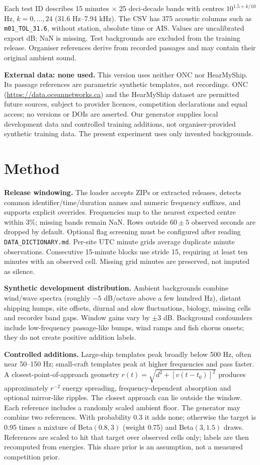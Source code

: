 \documentclass[a4paper,11pt]{article}
\begin{document}
Each test ID describes 15 minutes $\times$ 25 deci-decade bands with centres
$10^{1.5+k/10}$ Hz, $k=0,\ldots,24$ (31.6 Hz--7.94 kHz). The CSV has 375
acoustic columns such as \texttt{m01\_TOL\_31.6}, without station, absolute time
or AIS. Values are uncalibrated export dB; NaN is missing. Test backgrounds
are excluded from the training release. Organiser references derive from
recorded passages and may contain their original ambient sound.

\textbf{External data: none used.} This version uses neither ONC nor HearMyShip.
Its passage references are parametric synthetic templates, not recordings.
ONC (\url{https://data.oceannetworks.ca}) and the HearMyShip dataset are permitted
future sources, subject to provider licences, competition declarations and
equal access; no versions or DOIs are asserted. Our generator supplies local
development data and controlled training additions, not organiser-provided
synthetic training data. The present experiment uses only invented backgrounds.

\newpage
\section{Method}
\textbf{Release windowing.} The loader accepts ZIPs or extracted releases,
detects common identifier/time/duration names and numeric frequency suffixes,
and supports explicit overrides. Frequencies map to the nearest expected
centre within 3\%; missing bands remain NaN. Rows outside $60\pm5$ observed
seconds are dropped by default. Optional flag screening must be configured
after reading \texttt{DATA\_DICTIONARY.md}. Per-site UTC minute grids average
duplicate minute observations. Consecutive 15-minute blocks use stride 15,
requiring at least ten minutes with an observed cell. Missing grid minutes
are preserved, not imputed as silence.

\textbf{Synthetic development distribution.} Ambient backgrounds combine
wind/wave spectra (roughly $-5$ dB/octave above a few hundred Hz), distant
shipping humps, site offsets, diurnal and slow fluctuations, biology, missing
cells and recorder band gaps. Window gains vary by $\pm3$ dB. Background
confounders include low-frequency passage-like bumps, wind ramps and fish
chorus onsets; they do not create positive addition labels.

\textbf{Controlled additions.} Large-ship templates peak broadly below
500 Hz, often near 50--150 Hz; small-craft templates peak at higher frequencies
and pass faster. A closest-point-of-approach geometry
$r(t)=\sqrt{d^2+[v(t-t_0)]^2}$ produces approximately $r^{-2}$ energy spreading,
frequency-dependent absorption and optional mirror-like ripples. The closest
approach can lie outside the window. Each reference includes a randomly
scaled ambient floor. The generator may combine two references. With
probability 0.3 it adds none; otherwise the target is 0.95 times a mixture
of Beta$(0.8,3)$ (weight 0.75) and Beta$(3,1.5)$ draws. References are scaled
to hit that target over observed cells only; labels are then recomputed from
energies. This share prior is an assumption, not a measured competition prior.
\end{document}

